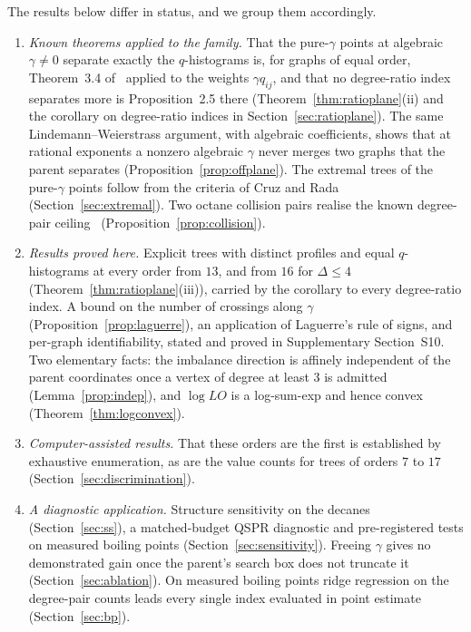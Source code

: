 \documentclass[a5paper, 10pt]{article}
\theoremstyle{plain}
\theoremstyle{remark}
\theoremstyle{definition}
\begin{document}
  The results below differ in status, and we group them accordingly.
  \begin{enumerate}
  \item[(i)] \emph{Known theorems applied to the family.} That the
  pure-$\gamma$ points at algebraic $\gamma \neq 0$ separate exactly the
  $q$-histograms is, for graphs of equal order, Theorem~3.4
  of~\cite{Rada2019ExpVDB} applied to the weights $\gamma q_{ij}$, and that no degree-ratio index separates more
  is Proposition~2.5 there (Theorem~\ref{thm:ratioplane}(ii) and the corollary on degree-ratio
  indices in Section~\ref{sec:ratioplane}). The same Lindemann--Weierstrass
  argument, with algebraic coefficients, shows that at rational exponents
  a nonzero algebraic $\gamma$ never merges two graphs that the parent
  separates (Proposition~\ref{prop:offplane}). The extremal trees of the
  pure-$\gamma$ points follow from the criteria of Cruz and
  Rada~\cite{CruzRada2019PathStar} (Section~\ref{sec:extremal}). Two
  octane collision pairs realise the known degree-pair
  ceiling~\cite[Section~3.1]{Rada2026LinearVDB}
  (Proposition~\ref{prop:collision}).
  \item[(ii)] \emph{Results proved here.} Explicit trees with distinct
  profiles and equal $q$-histograms at every order from $13$, and
  from $16$ for $\Delta \le 4$ (Theorem~\ref{thm:ratioplane}(iii)), carried
  by the corollary to every degree-ratio index. A bound on the number of
  crossings along $\gamma$ (Proposition~\ref{prop:laguerre}), an
  application of Laguerre's rule of signs, and per-graph identifiability,
  stated and proved in Supplementary Section~S10. Two elementary facts: the imbalance
  direction is affinely independent of the parent coordinates once a
  vertex of degree at least $3$ is admitted (Lemma~\ref{prop:indep}), and
  $\log LO$ is a log-sum-exp and hence convex
  (Theorem~\ref{thm:logconvex}).
  \item[(iii)] \emph{Computer-assisted results.} That these orders are
  the first is established by exhaustive enumeration, as are the value
  counts for trees of orders $7$ to $17$ (Section~\ref{sec:discrimination}).
  \item[(iv)] \emph{A diagnostic application.} Structure sensitivity on
  the decanes (Section~\ref{sec:ss}), a matched-budget QSPR diagnostic and
  pre-registered tests on measured boiling points
  (Section~\ref{sec:sensitivity}). Freeing $\gamma$ gives no demonstrated
  gain once the parent's search box does not truncate it
  (Section~\ref{sec:ablation}). On measured boiling points ridge
  regression on the degree-pair counts leads every single index evaluated
  in point estimate (Section~\ref{sec:bp}).
  \end{enumerate}
\end{document}
